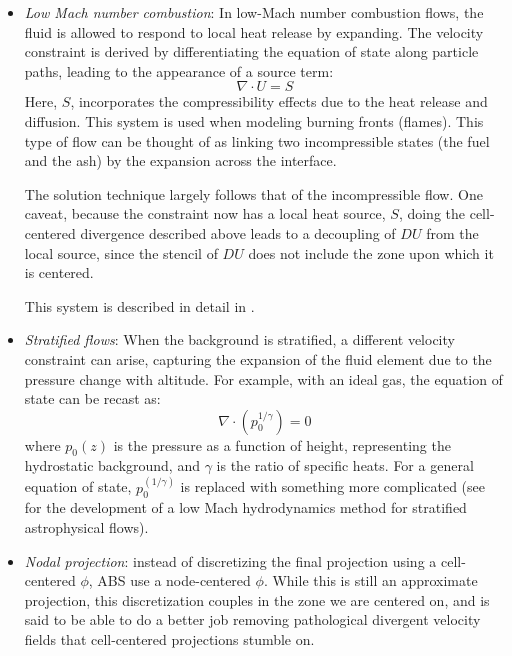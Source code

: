 \begin{itemize}
\item {\em Low Mach number combustion}: In low-Mach number combustion
  flows, the fluid is allowed to respond to local heat release 
  by expanding.  The velocity constraint is derived by differentiating
  the equation of state along particle paths, leading to the appearance
  of a source term:
  \begin{equation}
  \nabla \cdot U = S
  \end{equation}
  Here, $S$, incorporates the compressibility effects due to the 
  heat release and diffusion.  This system is used when modeling
  burning fronts (flames).  This type of flow can be thought
  of as linking two incompressible states (the fuel and the ash)
  by the expansion across the interface.

  The solution technique largely follows that of the incompressible
  flow.  One caveat, because the constraint now has a local heat
  source, $S$, doing the cell-centered divergence described above
  leads to a decoupling of $DU$ from the local source, since the
  stencil of $DU$ does not include the zone upon which it is centered.

  This system is described in detail in \cite{pember-flame,
    DayBell:2000,SNpaper}.

\item {\em Stratified flows}: When the background is stratified, a
  different velocity constraint can arise, capturing the expansion of
  the fluid element due to the pressure change with altitude.  For example,
  with an ideal gas, the equation of state can be recast as:
  \begin{equation}
  \nabla \cdot (p_0^{1/\gamma}) = 0
  \end{equation}
  where $p_0(z)$ is the pressure as a function of height,
  representing the hydrostatic background, and $\gamma$ is the ratio
  of specific heats.  For a general equation of state,
  $p_0^(1/\gamma)$ is replaced with something more complicated (see
  \cite{ABRZ:I,ABRZ:II,ABNZ:III} for the development of a low Mach
  hydrodynamics method for stratified astrophysical flows).

\item {\em Nodal projection}: instead of discretizing the final projection
  using a cell-centered $\phi$, ABS use a node-centered $\phi$.  While
  this is still an approximate projection, this discretization couples
  in the zone we are centered on, and is said to be able to do a better
  job removing pathological divergent velocity fields that cell-centered
  projections stumble on.

\end{itemize}


